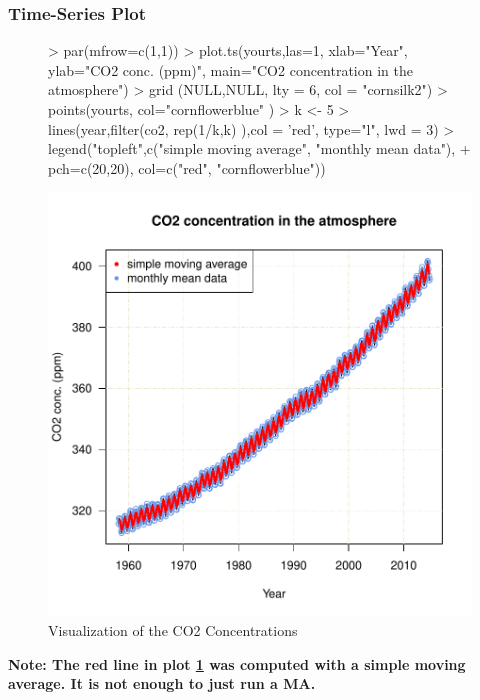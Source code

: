 \documentclass[11pt, a4paper]{article} %
\begin{document}
\subsubsection{Time-Series Plot}
\begin{figure}[H]
\centering
\begin{Schunk}
\begin{Sinput}
> par(mfrow=c(1,1))
> plot.ts(yourts,las=1, xlab="Year", ylab="CO2 conc. (ppm)", main="CO2 concentration in the atmosphere")
> grid (NULL,NULL, lty = 6, col = "cornsilk2")
> points(yourts, col="cornflowerblue" )
> k <- 5
> lines(year,filter(co2, rep(1/k,k) ),col = 'red', type="l", lwd = 3)
> legend("topleft",c("simple moving average", "monthly mean data"),
+ pch=c(20,20), col=c("red", "cornflowerblue"))
\end{Sinput}
\end{Schunk}
\includegraphics{sweaveclean-fig1visualize}
\caption{Visualization of the CO2 Concentrations}
\label{fig1visualize}
\end{figure}
\noindent \textbf{Note: The red line in plot \ref{fig1visualize} was computed with a simple moving average. It is not enough to just run a MA.}\\

\end{document}
